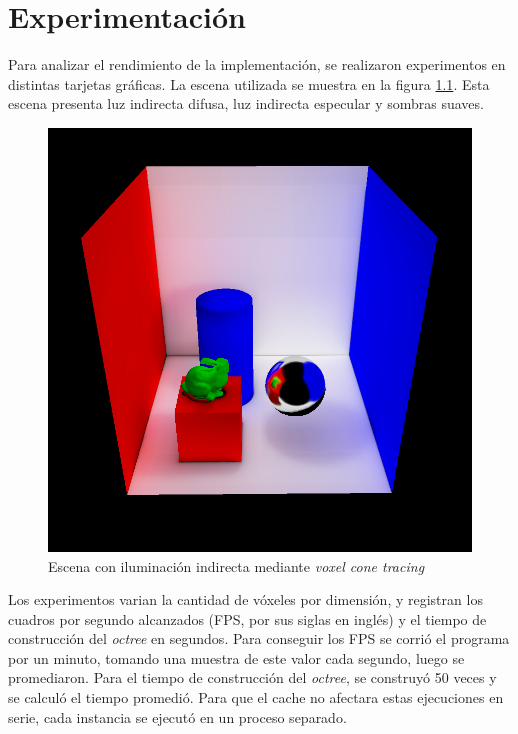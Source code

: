\graphicspath{{chapters/5_experimentos/figures/}}

\chapter{Experimentación}\label{chap:experiments}

Para analizar el rendimiento de la implementación, se realizaron experimentos en distintas tarjetas gráficas.
La escena utilizada se muestra en la figura \ref{fig:cornell-box-full}.
Esta escena presenta luz indirecta difusa, luz indirecta especular y sombras suaves.

\begin{figure}[ht]
	\centering
	\includegraphics[width=\textwidth]{cornell-box-full.png}
	\caption{Escena con iluminación indirecta mediante \textit{voxel cone tracing}}
	\label{fig:cornell-box-full}
\end{figure}

Los experimentos varian la cantidad de vóxeles por dimensión, y registran los cuadros por segundo alcanzados (FPS, por sus siglas en inglés) y el tiempo de construcción del \textit{octree} en segundos.
Para conseguir los FPS se corrió el programa por un minuto, tomando una muestra de este valor cada segundo, luego se promediaron.
Para el tiempo de construcción del \textit{octree}, se construyó 50 veces y se calculó el tiempo promedió.
Para que el cache no afectara estas ejecuciones en serie, cada instancia se ejecutó en un proceso separado.

